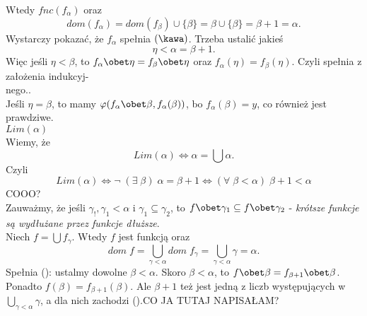Wtedy $fnc(f_\alpha)$ oraz 
$$dom(f_\alpha)=dom(f_\beta)\cup\{\beta\}=\beta\cup\{\beta\}=\beta+1=\alpha.$$
Wystarczy pokazać, że $f_\alpha$ spełnia $(\kawa)$. Trzeba ustalić jakieś 
$$\eta<\alpha=\beta+1.$$
Więc jeśli $\eta<\beta$, to $f_\alpha\obet\eta=f_\beta\obet\eta$ oraz $f_\alpha(\eta)=f_\beta(\eta)$. Czyli spełnia z założenia indukcyj-\\nego.. \\
Jeśli $\eta=\beta$, to mamy $\varphi(f_\alpha\obet\beta, f_\alpha(\beta))$, bo $f_\alpha(\beta)=y$, co również jest prawdziwe.\medskip\\
 $Lim(\alpha)$\smallskip\\
Wiemy, że
$$Lim(\alpha)\iff \alpha=\bigcup \alpha.$$
Czyli
$$Lim(\alpha)\iff\neg\;(\exists\;\beta)\;\alpha=\beta+1\iff(\forall\;\beta<\alpha)\;\beta+1<\alpha$$
{\color{cyan}COOO?}\medskip\\
Zauważmy, że jeśli $\gamma_!,\gamma_1<\alpha$ i $\gamma_1\subseteq\gamma_2$, to $f\obet\gamma_1\subseteq f\obet\gamma_2$ - \emph{krótsze funkcje są wydłużane przez funkcje dłuższe}. \medskip\\
Niech $f=\bigcup f_\gamma$. Wtedy $f$ jest funkcją oraz 
$$dom \;f=\bigcup\limits_{\gamma<\alpha}dom\;f_\gamma=\bigcup\limits_{\gamma<\alpha}\gamma=\alpha.$$
Spełnia (\kawa): ustalmy dowolne $\beta<\alpha$. Skoro $\beta<\alpha$, to $f\obet\beta=f_{\beta+1}\obet\beta$. Ponadto $f(\beta)=f_{\beta+1}(\beta).$ Ale $\beta+1$ też jest jedną z liczb występujących w $\bigcup\limits_{\gamma<\alpha}\gamma$, a dla nich zachodzi (\kawa).{\color{cyan}CO JA TUTAJ NAPISAŁAM?}


